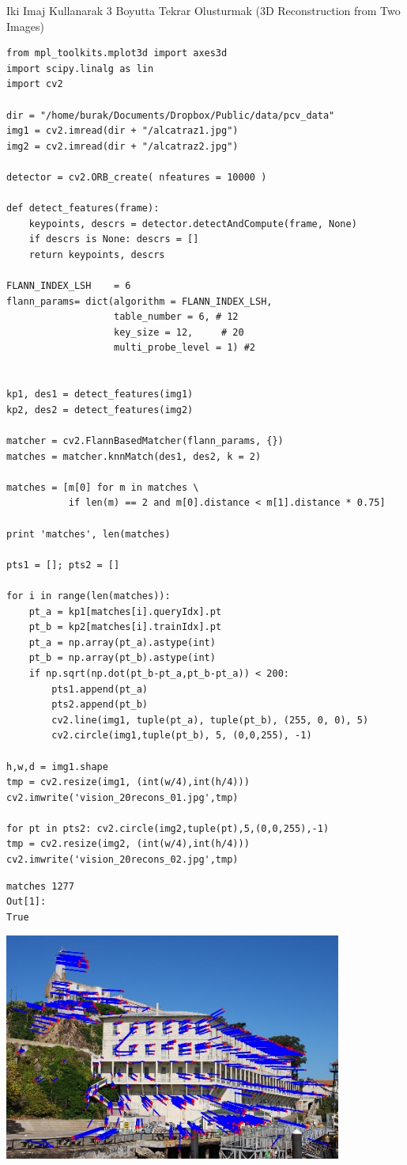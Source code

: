 \documentclass[12pt,fleqn]{article}\usepackage{../../common}
\begin{document}
Iki Imaj Kullanarak 3 Boyutta Tekrar Olusturmak (3D Reconstruction from Two Images)

\begin{verbatim}
from mpl_toolkits.mplot3d import axes3d
import scipy.linalg as lin
import cv2

dir = "/home/burak/Documents/Dropbox/Public/data/pcv_data"
img1 = cv2.imread(dir + "/alcatraz1.jpg")
img2 = cv2.imread(dir + "/alcatraz2.jpg")

detector = cv2.ORB_create( nfeatures = 10000 )

def detect_features(frame):
    keypoints, descrs = detector.detectAndCompute(frame, None)
    if descrs is None: descrs = []
    return keypoints, descrs

FLANN_INDEX_LSH    = 6
flann_params= dict(algorithm = FLANN_INDEX_LSH,
                   table_number = 6, # 12
                   key_size = 12,     # 20
                   multi_probe_level = 1) #2


kp1, des1 = detect_features(img1)
kp2, des2 = detect_features(img2)

matcher = cv2.FlannBasedMatcher(flann_params, {})
matches = matcher.knnMatch(des1, des2, k = 2)

matches = [m[0] for m in matches \
           if len(m) == 2 and m[0].distance < m[1].distance * 0.75]

print 'matches', len(matches)

pts1 = []; pts2 = []

for i in range(len(matches)):
    pt_a = kp1[matches[i].queryIdx].pt
    pt_b = kp2[matches[i].trainIdx].pt
    pt_a = np.array(pt_a).astype(int)
    pt_b = np.array(pt_b).astype(int)
    if np.sqrt(np.dot(pt_b-pt_a,pt_b-pt_a)) < 200:
        pts1.append(pt_a)
        pts2.append(pt_b)
        cv2.line(img1, tuple(pt_a), tuple(pt_b), (255, 0, 0), 5)
        cv2.circle(img1,tuple(pt_b), 5, (0,0,255), -1)

h,w,d = img1.shape
tmp = cv2.resize(img1, (int(w/4),int(h/4)))
cv2.imwrite('vision_20recons_01.jpg',tmp)

for pt in pts2: cv2.circle(img2,tuple(pt),5,(0,0,255),-1)
tmp = cv2.resize(img2, (int(w/4),int(h/4)))
cv2.imwrite('vision_20recons_02.jpg',tmp)
\end{verbatim}

\begin{verbatim}
matches 1277
Out[1]: 
True
\end{verbatim}

\includegraphics[width=30em]{vision_20recons_01.jpg}
\end{document}
